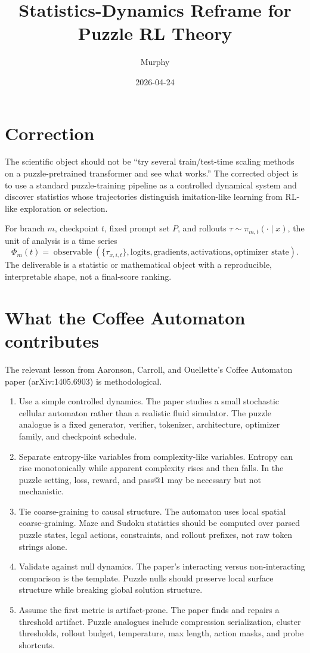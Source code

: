 \documentclass[11pt]{article}
\title{Statistics-Dynamics Reframe for Puzzle RL Theory}
\author{Murphy}
\date{2026-04-24}
\begin{document}
\maketitle

\section*{Correction}

The scientific object should not be ``try several train/test-time scaling methods
on a puzzle-pretrained transformer and see what works.'' The corrected object is
to use a standard puzzle-training pipeline as a controlled dynamical system and
discover statistics whose trajectories distinguish imitation-like learning from
RL-like exploration or selection.

For branch $m$, checkpoint $t$, fixed prompt set $P$, and rollouts
$\tau \sim \pi_{m,t}(\cdot \mid x)$, the unit of analysis is a time series
\[
\Phi_m(t) =
\operatorname{observable}(\{\tau_{x,i,t}\}, \text{logits}, \text{gradients},
\text{activations}, \text{optimizer state}).
\]
The deliverable is a statistic or mathematical object with a reproducible,
interpretable shape, not a final-score ranking.

\section*{What the Coffee Automaton contributes}

The relevant lesson from Aaronson, Carroll, and Ouellette's Coffee Automaton
paper (arXiv:1405.6903) is methodological.

\begin{enumerate}
\item Use a simple controlled dynamics. The paper studies a small stochastic
cellular automaton rather than a realistic fluid simulator. The puzzle analogue
is a fixed generator, verifier, tokenizer, architecture, optimizer family, and
checkpoint schedule.
\item Separate entropy-like variables from complexity-like variables. Entropy
can rise monotonically while apparent complexity rises and then falls. In the
puzzle setting, loss, reward, and pass@1 may be necessary but not mechanistic.
\item Tie coarse-graining to causal structure. The automaton uses local spatial
coarse-graining. Maze and Sudoku statistics should be computed over parsed
puzzle states, legal actions, constraints, and rollout prefixes, not raw token
strings alone.
\item Validate against null dynamics. The paper's interacting versus
non-interacting comparison is the template. Puzzle nulls should preserve local
surface structure while breaking global solution structure.
\item Assume the first metric is artifact-prone. The paper finds and repairs a
threshold artifact. Puzzle analogues include compression serialization, cluster
thresholds, rollout budget, temperature, max length, action masks, and probe
shortcuts.
\end{enumerate}
\end{document}
